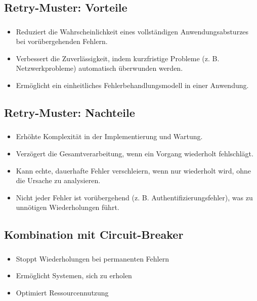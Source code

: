 \subsection{Retry-Muster: Vorteile}
\begin{frame}
    \frametitle{\insertsection}
    \framesubtitle{\insertsubsection}

    \begin{itemize}
    \item Reduziert die Wahrscheinlichkeit eines vollständigen Anwendungsabsturzes bei vorübergehenden Fehlern.
    \item Verbessert die Zuverlässigkeit, indem kurzfristige Probleme (z. B. Netzwerkprobleme) automatisch überwunden werden.
    \item Ermöglicht ein einheitliches Fehlerbehandlungsmodell in einer Anwendung.
\end{itemize}
\end{frame}

\subsection{Retry-Muster: Nachteile}
\begin{frame}
    \frametitle{\insertsection}
    \framesubtitle{\insertsubsection}

    \begin{itemize}
        \item Erhöhte Komplexität in der Implementierung und Wartung.
        \item Verzögert die Gesamtverarbeitung, wenn ein Vorgang wiederholt fehlschlägt.
        \item Kann echte, dauerhafte Fehler verschleiern, wenn nur wiederholt wird, ohne die Ursache zu analysieren.
        \item Nicht jeder Fehler ist vorübergehend (z. B. Authentifizierungsfehler), was zu unnötigen Wiederholungen führt.
    \end{itemize}
\end{frame}

\subsection{\textbf{Kombination mit Circuit-Breaker}}

\begin{frame}
    \frametitle{\insertsection}
    \framesubtitle{\insertsubsection}

    \begin{itemize}
        \item Stoppt Wiederholungen bei permanenten Fehlern
        \item Ermöglicht Systemen, sich zu erholen
        \item Optimiert Ressourcennutzung
    \end{itemize}
\end{frame}


